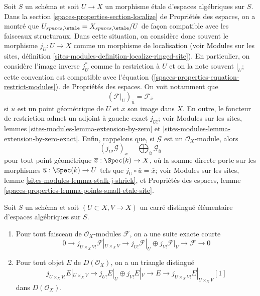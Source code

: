 \medskip\noindent
Soit $S$ un sch\'ema et soit $U \to X$ un morphisme \'etale d'espaces
alg\'ebriques sur $S$. Dans la section
\ref{spaces-properties-section-localize} de Propri\'et\'es des espaces,
on a montr\'e que
$U_{spaces, \etale} = X_{spaces, \etale}/U$
de fa\c{c}on compatible avec les faisceaux structuraux. Dans cette situation,
on consid\`ere donc souvent le morphisme $j_U : U \to X$ comme un morphisme
de localisation (voir Modules sur les sites, d\'efinition
\ref{sites-modules-definition-localize-ringed-site}).
En particulier, on consid\`ere l'image inverse $j_U^*$ comme la restriction
\`a $U$ et on la note souvent ${}|_U$; cette convention est compatible avec
l'\'equation
(\ref{spaces-properties-equation-restrict-modules}).
de Propri\'et\'es des espaces. On voit notamment que
\begin{equation}
\label{equation-stalk-restriction}
(\mathcal{F}|_U)_{\overline{u}} = \mathcal{F}_{\overline{x}}
\end{equation}
si $\overline{u}$ est un point g\'eom\'etrique de $U$ et $\overline{x}$ son
image dans $X$. En outre, le foncteur de restriction admet un adjoint \`a
gauche exact $j_{U!}$; voir Modules sur les sites, lemmes
\ref{sites-modules-lemma-extension-by-zero} et
\ref{sites-modules-lemma-extension-by-zero-exact}.
Enfin, rappelons que, si $\mathcal{G}$ est un $\mathcal{O}_X$-module, alors
\begin{equation}
\label{equation-stalk-j-shriek}
(j_{U!}\mathcal{G})_{\overline{x}} =
\bigoplus\nolimits_{\overline{u}} \mathcal{G}_{\overline{u}}
\end{equation}
pour tout point g\'eom\'etrique $\overline{x} : \Spec(k) \to X$, o\`u la
somme directe porte sur les morphismes $\overline{u} : \Spec(k) \to U$
tels que $j_U \circ \overline{u} = \overline{x}$; voir Modules sur les sites,
lemme \ref{sites-modules-lemma-stalk-j-shriek}, et Propri\'et\'es des espaces,
lemme
\ref{spaces-properties-lemma-points-small-etale-site}.

\begin{lemma}
\label{lemma-exact-sequence-lower-shriek}
Soit $S$ un sch\'ema et soit $(U \subset X, V \to X)$ un carr\'e distingu\'e
\'el\'ementaire d'espaces alg\'ebriques sur $S$.
\begin{enumerate}
\item Pour tout faisceau de $\mathcal{O}_X$-modules $\mathcal{F}$, on a une
suite exacte courte
$$
0 \to j_{U \times_X V!}\mathcal{F}|_{U \times_X V} \to
j_{U!}\mathcal{F}|_U \oplus j_{V!}\mathcal{F}|_V \to \mathcal{F} \to 0
$$
\item Pour tout objet $E$ de $D(\mathcal{O}_X)$, on a un triangle distingu\'e
$$
j_{U \times_X V!}E|_{U \times_X V} \to
j_{U!}E|_U \oplus j_{V!}E|_V \to E \to 
j_{U \times_X V!}E|_{U \times_X V}[1]
$$
dans $D(\mathcal{O}_X)$.
\end{enumerate}
\end{lemma}

